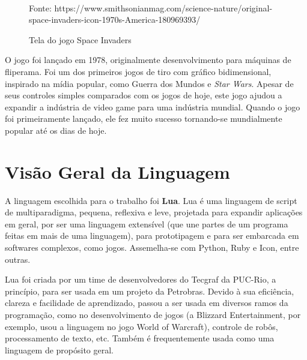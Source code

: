 \documentclass[rel_mlp]{iiufrgs}
\newcommand{\fonte}[1]{\\Fonte: {#1}}
\begin{document}
\begin{figure}[H]
     \centering
     \caption{Tela do jogo Space Invaders}
     \label{fig:Figura1}
     \fonte{https://www.smithsonianmag.com/science-nature/original-space-invaders-icon-1970s-America-180969393/}
 \end{figure}
 
O jogo foi lançado em 1978, originalmente desenvolvimento para máquinas de fliperama. Foi um dos primeiros jogos de tiro com gráfico bidimensional, inspirado na mídia popular, como Guerra dos Mundos e \textit{Star Wars}. Apesar de seus controles simples comparados com os jogos de hoje, este jogo ajudou a expandir a indústria de video game para uma indústria mundial. Quando o jogo foi primeiramente lançado, ele fez muito sucesso tornando-se mundialmente popular até os dias de hoje. 




\chapter{Visão Geral da Linguagem} \label{Linguagem}

A linguagem escolhida para o trabalho foi \textbf{Lua}. Lua é uma linguagem de script de multiparadigma, pequena, reflexiva e leve, projetada para expandir aplicações em geral, por ser uma linguagem extensível (que une partes de um programa feitas em mais de uma linguagem), para prototipagem e para ser embarcada em softwares complexos, como jogos. Assemelha-se com Python, Ruby e Icon, entre outras.

Lua foi criada por um time de desenvolvedores do Tecgraf da PUC-Rio, a princípio, para ser usada em um projeto da Petrobras. Devido à sua eficiência, clareza e facilidade de aprendizado, passou a ser usada em diversos ramos da programação, como no desenvolvimento de jogos (a Blizzard Entertainment, por exemplo, usou a linguagem no jogo World of Warcraft), controle de robôs, processamento de texto, etc. Também é frequentemente usada como uma linguagem de propósito geral.
\end{document}
